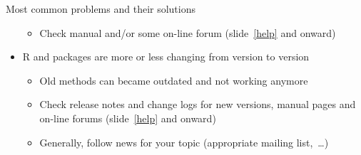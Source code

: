 \documentclass[compress, ucs, xelatex, 11pt, xcolor=svgnames, aspectratio=169,
	hyperref={
		bookmarks=true,
		unicode=true,
		colorlinks=true,
		pdftitle={Molecular data in R},
		plainpages=false,
		pdfauthor={Vojtech Zeisek},
		pdfsubject={Course about phylogeny and evolution in R},
		pdfcreator={XeLaTeX},
		pdfkeywords={R, evolution, phylogeny, molecular data},
		linkcolor=Crimson, %
		anchorcolor=Magenta, %
		citecolor=Magenta, %
		filecolor=Magenta, %
		menucolor=Magenta, %
		urlcolor=DodgerBlue, %
		pdftex},
	url={hyphens, lowtilde} %
	]{beamer}
\begin{document}
\begin{frame}[allowframebreaks]{Most common problems and their solutions}
\begin{itemize}
		\begin{itemize}
			\item Check manual and/or some on-line forum (slide~\ref{help} and onward)
		\end{itemize}
		\item R and packages are more or less changing from version to version
		\begin{itemize}
			\item Old methods can became outdated and not working anymore
			\item Check release notes and change logs for new versions, manual pages and on-line forums (slide~\ref{help} and onward)
			\item Generally, follow news for your topic (appropriate mailing list,~\ldots)
		\end{itemize}
	\end{itemize}
\end{frame}
\end{document}
